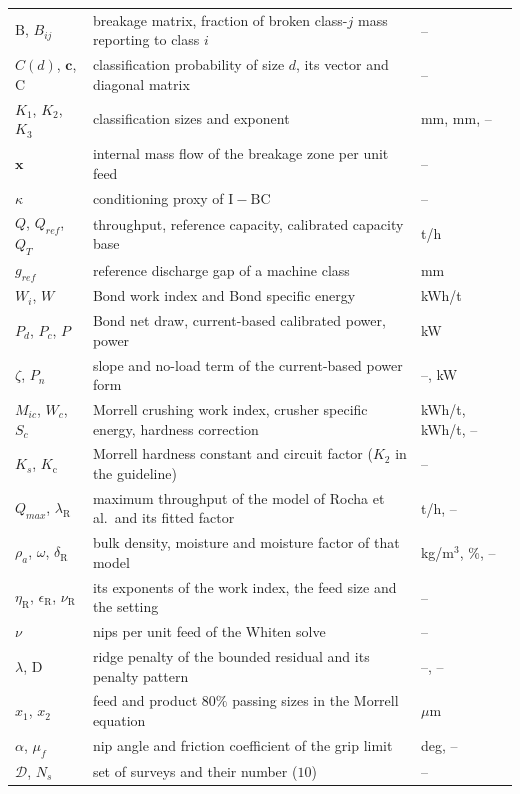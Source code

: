 \begin{longtable}{@{}p{} p{} p{}@{}}
$\mathrm B$, $B_{ij}$ & breakage matrix, fraction of broken class-$j$ mass reporting to class $i$ & -- \\
$C(d)$, $\mathbf c$, $\mathrm C$ & classification probability of size $d$, its vector and diagonal matrix & -- \\
$K_1$, $K_2$, $K_3$ & classification sizes and exponent & mm, mm, -- \\
$\mathbf x$ & internal mass flow of the breakage zone per unit feed & -- \\
$\kappa$ & conditioning proxy of $\mathrm I-\mathrm B\mathrm C$ & -- \\
$Q$, $Q_{ref}$, $Q_T$ & throughput, reference capacity, calibrated capacity base & t/h \\
$g_{ref}$ & reference discharge gap of a machine class & mm \\
$W_i$, $W$ & Bond work index and Bond specific energy & kWh/t \\
$P_d$, $P_c$, $P$ & Bond net draw, current-based calibrated power, power & kW \\
$\zeta$, $P_n$ & slope and no-load term of the current-based power form & --, kW \\
$M_{ic}$, $W_c$, $S_c$ & Morrell crushing work index, crusher specific energy, hardness correction & kWh/t, kWh/t, -- \\
$K_s$, $K_{\mathrm c}$ & Morrell hardness constant and circuit factor ($K_2$ in the guideline) & -- \\
$Q_{max}$, $\lambda_{\mathrm R}$ & maximum throughput of the model of Rocha et al.\ and its fitted factor & t/h, -- \\
$\rho_a$, $\omega$, $\delta_{\mathrm R}$ & bulk density, moisture and moisture factor of that model & kg/m$^3$, \%, -- \\
$\eta_{\mathrm R}$, $\epsilon_{\mathrm R}$, $\nu_{\mathrm R}$ & its exponents of the work index, the feed size and the setting & -- \\
$\nu$ & nips per unit feed of the Whiten solve & -- \\
$\lambda$, $\mathrm D$ & ridge penalty of the bounded residual and its penalty pattern & --, -- \\
$x_1$, $x_2$ & feed and product $80\%$ passing sizes in the Morrell equation & $\mu$m \\
$\alpha$, $\mu_f$ & nip angle and friction coefficient of the grip limit & deg, -- \\
$\mathcal D$, $N_s$ & set of surveys and their number ($10$) & -- \\

\end{longtable}
